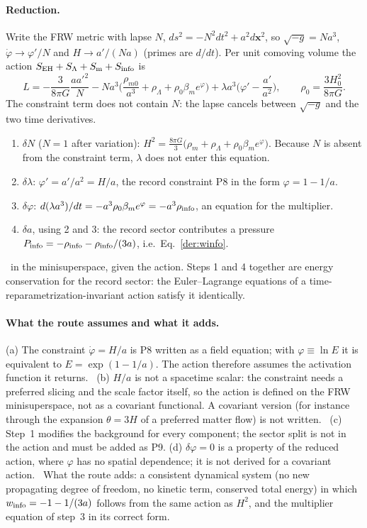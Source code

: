 \paragraph{Reduction.} Write the FRW metric with lapse $N$, $ds^2=-N^2dt^2+a^2d\mathbf x^2$, so $\sqrt{-g}=Na^3$, $\dot\varphi\to\varphi'/N$ and
$H\to a'/(Na)$ (primes are $d/dt$). Per unit comoving volume the action $S_{\rm EH}+S_\Lambda+S_{\rm m}+S_{\rm info}$ is
\begin{equation}
L=-\frac{3}{8\pi G}\frac{aa'^2}{N}-Na^3\Big(\frac{\rho_{m0}}{a^3}+\rho_\Lambda+\rho_0\beta_me^{\varphi}\Big)+\lambda a^3\Big(\varphi'-\frac{a'}{a^2}\Big),
\qquad\rho_0=\frac{3H_0^2}{8\pi G}.
\end{equation}
The constraint term does not contain $N$: the lapse cancels between $\sqrt{-g}$ and the two time derivatives.
\begin{enumerate}
\item $\delta N$ ($N=1$ after variation): $H^2=\tfrac{8\pi G}{3}\big(\rho_m+\rho_\Lambda+\rho_0\beta_me^\varphi\big)$. Because $N$ is absent from the constraint
term, $\lambda$ does not enter this equation.
\item $\delta\lambda$: $\varphi'=a'/a^2=H/a$, the record constraint P8 in the form $\varphi=1-1/a$.
\item $\delta\varphi$: $d(\lambda a^3)/dt=-a^3\rho_0\beta_me^\varphi=-a^3\rho_{\rm info}$, an equation for the multiplier.
\item $\delta a$, using 2 and 3: the record sector contributes a pressure $P_{\rm info}=-\rho_{\rm info}-\rho_{\rm info}/(3a)$, i.e.\ Eq.~\eqref{der:winfo}.
\end{enumerate}
\derived\ in the minisuperspace, given the action. Steps 1 and 4 together are energy conservation for the record sector: the Euler--Lagrange equations of
a time-reparametrization-invariant action satisfy it identically.

\paragraph{What the route assumes and what it adds.} (a) The constraint $\dot\varphi=H/a$ is P8 written as a field equation; with $\varphi\equiv\ln E$ it
is equivalent to $E=\exp(1-1/a)$. The action therefore assumes the activation function it returns. \conjecture\ (b) $H/a$ is not a spacetime scalar:
the constraint needs a preferred slicing and the scale factor itself, so the action is defined on the FRW minisuperspace, not as a covariant functional.
A covariant version (for instance through the expansion $\theta=3H$ of a preferred matter flow) is not written. \openprob\ (c) Step~1 modifies the
background for every component; the sector split is not in the action and must be added as P9. (d) $\delta\varphi=0$ is a property of the reduced
action, where $\varphi$ has no spatial dependence; it is not derived for a covariant action. \conjecture\ What the route adds: a consistent dynamical
system (no new propagating degree of freedom, no kinetic term, conserved total energy) in which $w_{\rm info}=-1-1/(3a)$ follows from the same action as
$H^2$, and the multiplier equation of step~3 in its correct form.

